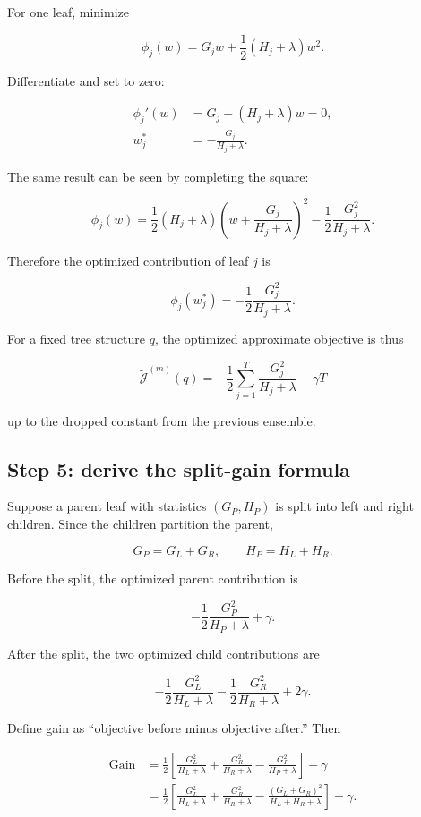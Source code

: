 \documentclass[11pt]{article}
\begin{document}
For one leaf, minimize

\[
 \phi_j(w)=G_jw+\frac12(H_j+\lambda)w^2.
\]

Differentiate and set to zero:

\begin{align*}
 \phi_j'(w)
 &=G_j+(H_j+\lambda)w=0,\\
 w_j^*
 &=\boxed{-\frac{G_j}{H_j+\lambda}}.
\end{align*}

The same result can be seen by completing the square:

\[
 \phi_j(w)
 =\frac12(H_j+\lambda)
 \left(w+\frac{G_j}{H_j+\lambda}\right)^2
 -\frac12\frac{G_j^2}{H_j+\lambda}.
\]

Therefore the optimized contribution of leaf $j$ is

\[
 \phi_j(w_j^*)=-\frac12\frac{G_j^2}{H_j+\lambda}.
\]

For a fixed tree structure $q$, the optimized approximate objective is thus

\[
 \boxed{
 \widetilde{\mathcal J}^{(m)}(q)
 =-\frac12\sum_{j=1}^T\frac{G_j^2}{H_j+\lambda}
 +\gamma T
 }
\]

up to the dropped constant from the previous ensemble.

\subsection{Step 5: derive the split-gain formula}

Suppose a parent leaf with statistics $(G_P,H_P)$ is split into left and right
children. Since the children partition the parent,

\[
 G_P=G_L+G_R,
 \qquad
 H_P=H_L+H_R.
\]

Before the split, the optimized parent contribution is

\[
 -\frac12\frac{G_P^2}{H_P+\lambda}+\gamma.
\]

After the split, the two optimized child contributions are

\[
 -\frac12\frac{G_L^2}{H_L+\lambda}
 -\frac12\frac{G_R^2}{H_R+\lambda}
 +2\gamma.
\]

Define gain as ``objective before minus objective after.'' Then

\begin{align*}
\mathrm{Gain}
&=\frac12\left[
 \frac{G_L^2}{H_L+\lambda}
 +\frac{G_R^2}{H_R+\lambda}
 -\frac{G_P^2}{H_P+\lambda}
 \right]-\gamma\\
&=\boxed{
 \frac12\left[
 \frac{G_L^2}{H_L+\lambda}
 +\frac{G_R^2}{H_R+\lambda}
 -\frac{(G_L+G_R)^2}{H_L+H_R+\lambda}
 \right]-\gamma}.
\end{align*}
\end{document}
